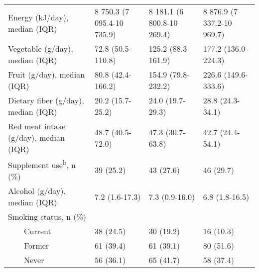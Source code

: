 \begin{table}
\begin{adjustbox}{width=\textwidth}
\begin{tabular}{L{4.8cm}C{3.5cm}C{3.5cm}C{3.5cm}}
Energy (kJ/day), median (IQR) & 8 750.3 (7 095.4-10 735.9) & 8 181.1 (6 800.8-10 269.4) & 8 876.9 (7 337.2-10 969.7)\\
Vegetable (g/day), median (IQR) & 72.8 (50.5-110.8) & 125.2 (88.3-161.9) & 177.2 (136.0-224.3)\\
Fruit (g/day), median (IQR) & 80.8 (42.4-166.2) & 154.9 (79.8-232.2) & 226.6 (149.6-333.6)\\
Dietary fiber (g/day), median (IQR) & 20.2 (15.7-25.2) & 24.0 (19.7-29.3) & 28.8 (24.3-34.1)\\
Red meat intake (g/day), median (IQR) & 48.7 (40.5-72.0) & 47.3 (30.7-63.8) & 42.7 (24.4-54.1)\\
{Supplement use}\textsuperscript{b}{, n (\%)} & 39 (25.2) & 43 (27.6) & 46 (29.7)\\
 Alcohol (g/day), median (IQR) & 7.2 (1.6-17.3) & 7.3 (0.9-16.0) & 6.8 (1.8-16.5)\\
 Smoking status, n (\%) & ~ & ~ & ~ \\
 \ \ \ \ Current & 38 (24.5) & 30 (19.2) & 16 (10.3)\\
 \ \ \ \ Former & 61 (39.4) & 61 (39.1) & 80 (51.6)\\
 \ \ \ \ Never & 56 (36.1) & 65 (41.7) & 58 (37.4)\\

\end{tabular}
\end{adjustbox}
\end{table}

